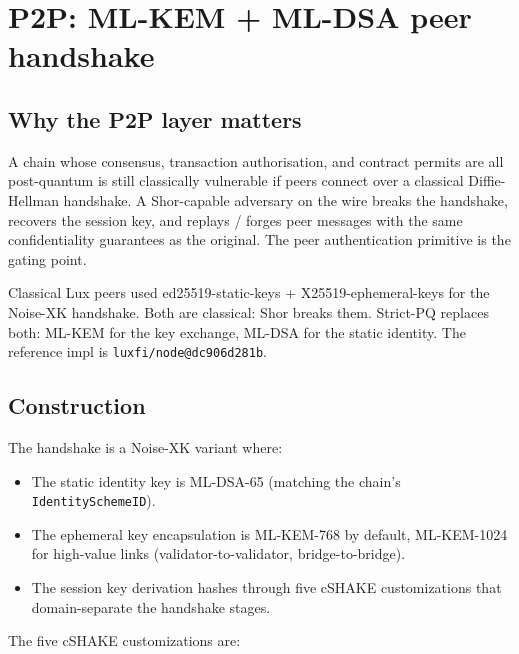 \section{P2P: ML-KEM + ML-DSA peer handshake}
\label{sec:p2p-pq}

\subsection{Why the P2P layer matters}

A chain whose consensus, transaction authorisation, and contract permits are
all post-quantum is still classically vulnerable if peers connect over a
classical Diffie-Hellman handshake. A Shor-capable adversary on the wire
breaks the handshake, recovers the session key, and replays / forges peer
messages with the same confidentiality guarantees as the original. The peer
authentication primitive is the gating point.

Classical Lux peers used ed25519-static-keys + X25519-ephemeral-keys for the
Noise-XK handshake. Both are classical: Shor breaks them. Strict-PQ replaces
both: ML-KEM for the key exchange, ML-DSA for the static identity. The
reference impl is \texttt{luxfi/node@dc906d281b}.

\subsection{Construction}

The handshake is a Noise-XK variant where:

\begin{itemize}[leftmargin=2em,nosep]
  \item The static identity key is ML-DSA-65 (matching the chain's
    \texttt{IdentitySchemeID}).
  \item The ephemeral key encapsulation is ML-KEM-768 by default, ML-KEM-1024
    for high-value links (validator-to-validator, bridge-to-bridge).
  \item The session key derivation hashes through five cSHAKE customizations
    that domain-separate the handshake stages.
\end{itemize}

The five cSHAKE customizations are:

